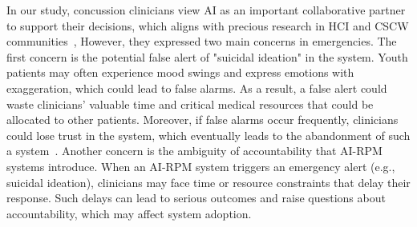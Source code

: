 In our study, concussion clinicians view AI as an important collaborative partner to support their decisions, which aligns with precious research in HCI and CSCW communities~\cite{zhang2024rethinking, hao2024advancing, yang2019unremarkable, zhang2020effect}, 
However, they expressed two main concerns in emergencies.
The first concern is the potential false alert of "suicidal ideation" in the system. 
Youth patients may often experience mood swings and express emotions with exaggeration, which could lead to false alarms.
As a result, a false alert could waste clinicians' valuable time and critical medical resources that could be allocated to other patients. 
Moreover, if false alarms occur frequently, clinicians could lose trust in the system, which eventually leads to the abandonment of such a system~\cite{liao2020questioning, amershi2019guidelines}. 
Another concern is the ambiguity of accountability that AI-RPM systems introduce. 
When an AI-RPM system triggers an emergency alert (e.g., suicidal ideation), clinicians may face time or resource constraints that delay their response. 
Such delays can lead to serious outcomes and raise questions about accountability, which may affect system adoption.



